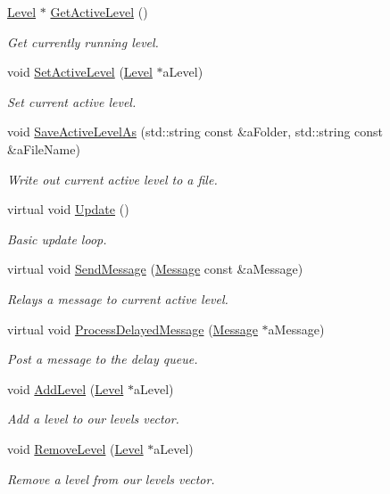\begin{DoxyCompactItemize}
\hyperlink{classLevel}{Level} $\ast$ \hyperlink{classLevelManager_a84027aa3e60d2a76455413611ac9498e}{Get\+Active\+Level} ()
\begin{DoxyCompactList}\small\item\em Get currently running level. \end{DoxyCompactList}\item 
void \hyperlink{classLevelManager_a0c563fcfa58c49b835d7d81a6191219f}{Set\+Active\+Level} (\hyperlink{classLevel}{Level} $\ast$a\+Level)
\begin{DoxyCompactList}\small\item\em Set current active level. \end{DoxyCompactList}\item 
void \hyperlink{classLevelManager_aa3a9f9538af307f77a66f61d6e4d2954}{Save\+Active\+Level\+As} (std\+::string const \&a\+Folder, std\+::string const \&a\+File\+Name)
\begin{DoxyCompactList}\small\item\em Write out current active level to a file. \end{DoxyCompactList}\item 
virtual void \hyperlink{classLevelManager_a7800611361e7c2ae99102e69429456fc}{Update} ()
\begin{DoxyCompactList}\small\item\em Basic update loop. \end{DoxyCompactList}\item 
virtual void \hyperlink{classLevelManager_a4cc512a6416f28ea8bfee08ed780e876}{Send\+Message} (\hyperlink{classMessage}{Message} const \&a\+Message)
\begin{DoxyCompactList}\small\item\em Relays a message to current active level. \end{DoxyCompactList}\item 
virtual void \hyperlink{classLevelManager_a375d01bd082ee3fd3981925f0b6a5640}{Process\+Delayed\+Message} (\hyperlink{classMessage}{Message} $\ast$a\+Message)
\begin{DoxyCompactList}\small\item\em Post a message to the delay queue. \end{DoxyCompactList}\item 
void \hyperlink{classLevelManager_a35d809424a4acca73b44458d7c2a69f5}{Add\+Level} (\hyperlink{classLevel}{Level} $\ast$a\+Level)
\begin{DoxyCompactList}\small\item\em Add a level to our levels vector. \end{DoxyCompactList}\item 
void \hyperlink{classLevelManager_a4458b0e93958d9b53513335b7fe862a1}{Remove\+Level} (\hyperlink{classLevel}{Level} $\ast$a\+Level)
\begin{DoxyCompactList}\small\item\em Remove a level from our levels vector. \end{DoxyCompactList}\end{DoxyCompactItemize}
